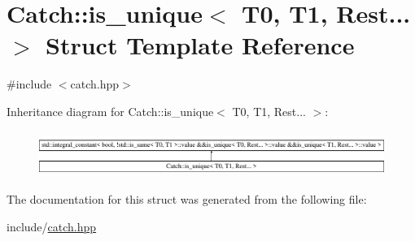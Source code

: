 \hypertarget{struct_catch_1_1is__unique_3_01_t0_00_01_t1_00_01_rest_8_8_8_01_4}{}\section{Catch\+::is\+\_\+unique$<$ T0, T1, Rest... $>$ Struct Template Reference}
\label{struct_catch_1_1is__unique_3_01_t0_00_01_t1_00_01_rest_8_8_8_01_4}


{\ttfamily \#include $<$catch.\+hpp$>$}

Inheritance diagram for Catch\+::is\+\_\+unique$<$ T0, T1, Rest... $>$\+:\begin{figure}[H]
\begin{center}
\leavevmode
\includegraphics[height=1.483444cm]{struct_catch_1_1is__unique_3_01_t0_00_01_t1_00_01_rest_8_8_8_01_4}
\end{center}
\end{figure}


The documentation for this struct was generated from the following file\+:\begin{DoxyCompactItemize}
\item 
include/\mbox{\hyperlink{catch_8hpp}{catch.\+hpp}}\end{DoxyCompactItemize}
